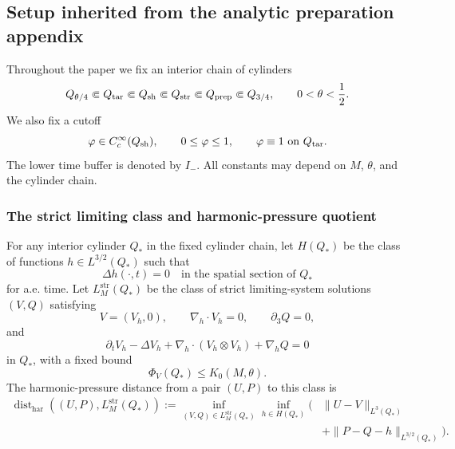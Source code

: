 \documentclass[11pt]{article}
\numberwithin{equation}{section}
\theoremstyle{plain}
\theoremstyle{definition}
\theoremstyle{remark}
\newcommand{\har}{\mathrm{har}}
\newcommand{\str}{\mathrm{str}}
\begin{document}
\subsection{Setup inherited from the analytic preparation appendix}\label{pII:sec:setup}

Throughout the paper we fix an interior chain of cylinders
\begin{equation}\label{pII:eq:cylinder-chain}
        Q_{\theta/4}\Subset Q_{\rm tar}\Subset Q_{\rm sh}\Subset Q_{\rm str}\Subset Q_{\rm prep}\Subset Q_{3/4},
        \qquad 0<\theta<\frac12.
\end{equation}
We also fix a cutoff
\begin{equation}\label{pII:eq:cutoff}
        \varphi\in C_c^\infty(Q_{\rm sh}),
        \qquad 0\le\varphi\le1,
        \qquad \varphi\equiv1\text{ on }Q_{\rm tar}.
\end{equation}
The lower time buffer is denoted by $I_-$.  All constants may depend on $M$, $\theta$, and the cylinder chain.

\subsubsection{The strict limiting class and harmonic-pressure quotient}

For any interior cylinder $Q_*$ in the fixed cylinder chain, let $H(Q_*)$ be the class of functions $h\in L^{3/2}(Q_*)$ such that
\[
        \Delta h(\cdot,t)=0
        \quad\text{in the spatial section of }Q_*
\]
for a.e. time.  Let $L_M^{\str}(Q_*)$ be the class of strict limiting-system solutions $(V,Q)$ satisfying
\begin{equation}\label{pII:eq:strict-system-section}
        V=(V_h,0),
        \qquad \nabla_h\cdot V_h=0,
        \qquad \partial_3Q=0,
\end{equation}
and
\begin{equation}\label{pII:eq:strict-equation-section}
        \partial_tV_h-\Delta V_h+\nabla_h\cdot(V_h\otimes V_h)+\nabla_hQ=0
\end{equation}
in $Q_*$, with a fixed bound
\begin{equation}\label{pII:eq:strict-bound}
        \Phi_V(Q_*)\le K_0(M,\theta).
\end{equation}
The harmonic-pressure distance from a pair $(U,P)$ to this class is
\begin{equation}\label{pII:eq:dist-har}
\begin{aligned}
        \operatorname{dist}_{\har}((U,P),L_M^{\str}(Q_*))
        :=\inf_{(V,Q)\in L_M^{\str}(Q_*)}
        \inf_{h\in H(Q_*)}
        \Big(&\|U-V\|_{L^3(Q_*)} \\
        &+\|P-Q-h\|_{L^{3/2}(Q_*)}\Big).
\end{aligned}
\end{equation}
\end{document}
